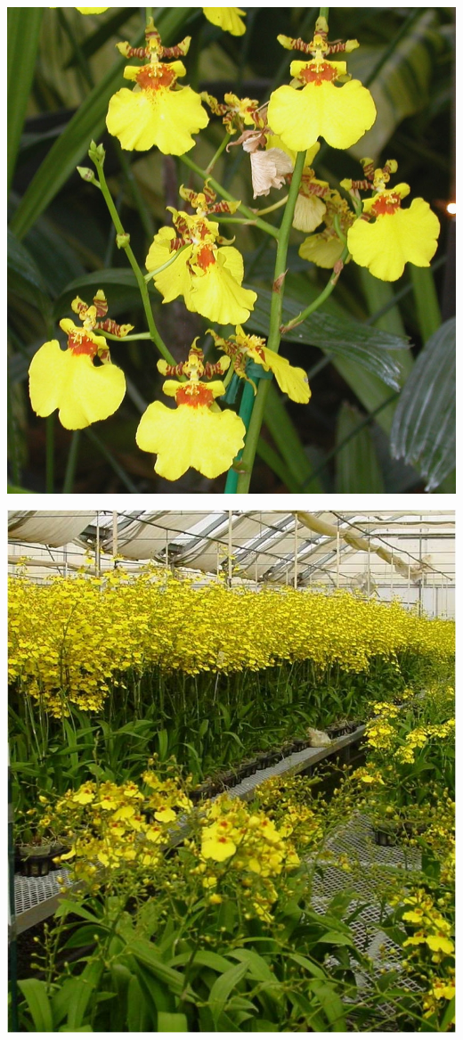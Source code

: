 \documentclass{article}
\begin{document}
\begin{center}
\includegraphics[width=0.9\textheight, angle=90]{../Orchid_Oncidium2.jpg}
\end{center}
\newpage

\begin{center}
\includegraphics[width=0.9\textheight, angle=90]{../Orchid_Oncidium_Plant.jpg}
\end{center}
\newpage
\end{document}
